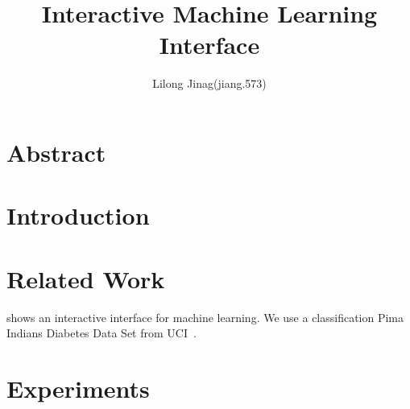\documentclass{article}
\begin{document}
\title{Interactive Machine Learning Interface}
\author{Lilong Jinag(jiang.573)}
\maketitle
\section{Abstract}
\section{Introduction}


\section{Related Work}
\cite{crotty2015vizdom} shows an interactive interface for machine learning. 
We use a classification Pima Indians Diabetes Data Set from UCI~\cite{smith1988using}.
\section{Experiments}



\end{document}
